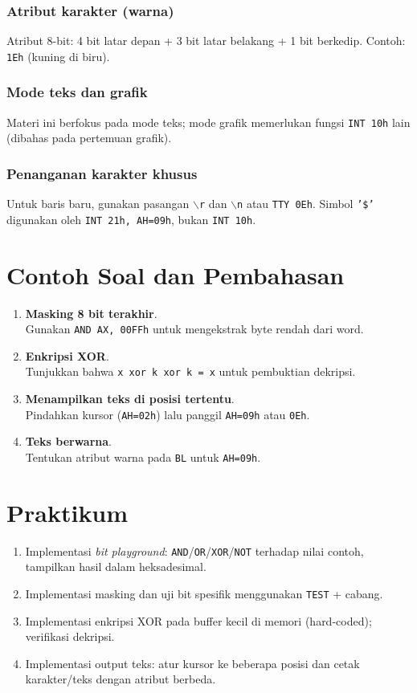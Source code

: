 \subsubsection{Atribut karakter (warna)}
Atribut 8-bit: 4 bit latar depan + 3 bit latar belakang + 1 bit berkedip. Contoh: \texttt{1Eh} (kuning di biru).

\subsubsection{Mode teks dan grafik}
Materi ini berfokus pada mode teks; mode grafik memerlukan fungsi \texttt{INT 10h} lain (dibahas pada pertemuan grafik).

\subsubsection{Penanganan karakter khusus}
Untuk baris baru, gunakan pasangan \texttt{$\backslash$r} dan \texttt{$\backslash$n} atau \texttt{TTY 0Eh}. Simbol \texttt{'\$'} digunakan oleh \texttt{INT 21h, AH=09h}, bukan \texttt{INT 10h}.

\section{Contoh Soal dan Pembahasan}
\begin{enumerate}
  \item \textbf{Masking 8 bit terakhir}.\\ Gunakan \texttt{AND AX, 00FFh} untuk mengekstrak byte rendah dari word.
  \item \textbf{Enkripsi XOR}.\\ Tunjukkan bahwa \texttt{x xor k xor k = x} untuk pembuktian dekripsi.
  \item \textbf{Menampilkan teks di posisi tertentu}.\\ Pindahkan kursor (\texttt{AH=02h}) lalu panggil \texttt{AH=09h} atau \texttt{0Eh}.
  \item \textbf{Teks berwarna}.\\ Tentukan atribut warna pada \texttt{BL} untuk \texttt{AH=09h}.
\end{enumerate}

\section{Praktikum}
\begin{enumerate}
  \item Implementasi \textit{bit playground}: \texttt{AND}/\texttt{OR}/\texttt{XOR}/\texttt{NOT} terhadap nilai contoh, tampilkan hasil dalam heksadesimal.
  \item Implementasi masking dan uji bit spesifik menggunakan \texttt{TEST} + cabang.
  \item Implementasi enkripsi XOR pada buffer kecil di memori (hard-coded); verifikasi dekripsi.
  \item Implementasi output teks: atur kursor ke beberapa posisi dan cetak karakter/teks dengan atribut berbeda.
\end{enumerate}

